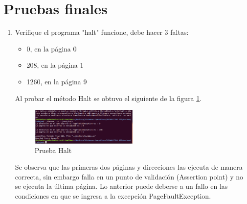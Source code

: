 \documentclass[11pt]{article}
\begin{document}
\section{Pruebas finales}  
\begin{enumerate}
  \item  Verifique el programa "halt" funcione, debe hacer 3 faltas:
    \begin{itemize}
      \item         0, en la página 0
       \item   208, en la página 1
        \item 1260, en la página 9

    \end{itemize}
    Al  probar el método Halt se obtuvo el siguiente de la figura \ref{fig:02}.\\
    \begin{figure}[b]
  \begin{center}
    \includegraphics[width=0.5\textwidth]{Resultado_final_Halt.PNG}
    \caption{Prueba Halt }
    \label{fig:02}
  \end{center}
\end{figure}
Se observa que las primeras dos páginas y direcciones las ejecuta de manera correcta, sin embargo falla en un punto de validación (Assertion point) y no se ejecuta la última página. Lo anterior puede deberse a un fallo en las condiciones en que se ingresa a la excepción PageFaultException.
\end{enumerate}
    
\end{document}

